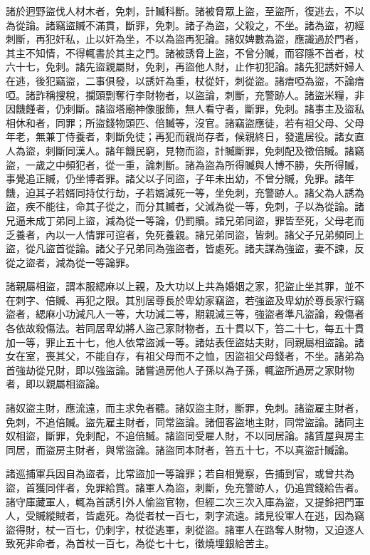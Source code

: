 \begin{pinyinscope}
 諸於迥野盜伐人材木者，免刺，計贓科斷。諸被脅眾上盜，至盜所，復逃去，不以為從論。諸竊盜贓不滿貫，斷罪，免刺。諸子為盜，父殺之，不坐。諸為盜，初經刺斷，再犯奸私，止以奸為坐，不以為盜再犯論。諸奴婢數為盜，應識過於門者，其主不知情，不得輒書於其主之門。諸被誘脅上盜，不曾分贓，而容隱不首者，杖六十七，免刺。諸先盜親屬財，免刺，再盜他人財，止作初犯論。諸先犯誘奸婦人在逃，後犯竊盜，二事俱發，以誘奸為重，杖從奸，刺從盜。諸瘖啞為盜，不論瘖啞。諸詐稱搜稅，攔頭剽奪行李財物者，以盜論，刺斷，充警跡人。諸盜米糧，非因饑饉者，仍刺斷。諸盜塔廟神像服飾，無人看守者，斷罪，免刺。諸事主及盜私相休和者，同罪；所盜錢物頭匹、倍贓等，沒官。諸竊盜應徒，若有祖父母、父母年老，無兼丁侍養者，刺斷免徒；再犯而親尚存者，候親終日，發遣居役。諸女直人為盜，刺斷同漢人。諸年饑民窮，見物而盜，計贓斷罪，免刺配及徵倍贓。諸竊盜，一歲之中頻犯者，從一重，論刺斷。諸為盜為所得贓與人博不勝，失所得贓，事覺追正贓，仍坐博者罪。諸父以子同盜，子年未出幼，不曾分贓，免罪。諸年饑，迫其子若婿同持仗行劫，子若婿減死一等，坐免刺，充警跡人。諸父為人誘為盜，疾不能往，命其子從之，而分其贓者，父減為從一等，免刺，子以為從論。諸兄逼未成丁弟同上盜，減為從一等論，仍罰贖。諸兄弟同盜，罪皆至死，父母老而乏養者，內以一人情罪可逭者，免死養親。諸兄弟同盜，皆刺。諸父子兄弟頻同上盜，從凡盜首從論。諸父子兄弟同為強盜者，皆處死。諸夫謀為強盜，妻不諫，反從之盜者，減為從一等論罪。



 諸親屬相盜，謂本服緦麻以上親，及大功以上共為婚姻之家，犯盜止坐其罪，並不在刺字、倍贓、再犯之限。其別居尊長於卑幼家竊盜，若強盜及卑幼於尊長家行竊盜者，緦麻小功減凡人一等，大功減二等，期親減三等，強盜者準凡盜論，殺傷者各依故殺傷法。若同居卑幼將人盜己家財物者，五十貫以下，笞二十七，每五十貫加一等，罪止五十七，他人依常盜減一等。諸姑表侄盜姑夫財，同親屬相盜論。諸女在室，喪其父，不能自存，有祖父母而不之恤，因盜祖父母錢者，不坐。諸弟為首強劫從兄財，即以強盜論。諸嘗過房他人子孫以為子孫，輒盜所過房之家財物者，即以親屬相盜論。



 諸奴盜主財，應流遠，而主求免者聽。諸奴盜主財，斷罪，免刺。諸盜雇主財者，免刺，不追倍贓。盜先雇主財者，同常盜論。諸佃客盜地主財，同常盜論。諸同主奴相盜，斷罪，免刺配，不追倍贓。諸盜同受雇人財，不以同居論。諸賃屋與房主同居，而盜房主財者，與常盜論。諸盜同本財者，笞五十七，不以真盜計贓論。



 諸巡捕軍兵因自為盜者，比常盜加一等論罪；若自相覺察，告捕到官，或曾共為盜，首獲同伴者，免罪給賞。諸軍人為盜，刺斷，免充警跡人，仍追賞錢給告者。諸守庫藏軍人，輒為首誘引外人偷盜官物，但經二次三次入庫為盜，又提鈴把門軍人，受贓縱賊者，皆處死。為從者杖一百七，刺字流遠。諸見役軍人在逃，因為竊盜得財，杖一百七，仍刺字，杖從逃軍，刺從盜。諸軍人在路奪人財物，又迫逐人致死非命者，為首杖一百七，為從七十七，徵燒埋銀給苦主。




\end{pinyinscope}
